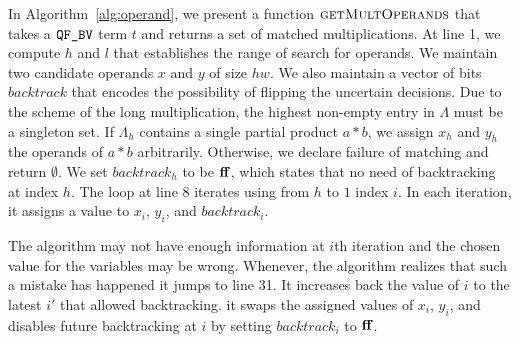 In Algorithm~\ref{alg:operand}, we present a function
$\textsc{getMultOperands}$ that takes a $\texttt{QF\_BV}$ term $t$ and returns a
set of matched multiplications.
%
At line 1, we compute $h$ and $l$ that establishes the range of search for
operands.
%
We maintain two candidate operands $x$ and $y$ of size $hw$.
%
We also maintain a vector of bits $backtrack$ that encodes 
the possibility of flipping the uncertain decisions.
%
Due to the scheme of the long multiplication, the highest
non-empty entry in $\Lambda$ must be a singleton set.
%
If $\Lambda_h$ contains a single partial product $a*b$,
we assign $x_h$ and $y_h$ the operands of $a*b$ arbitrarily.
%
Otherwise, we declare failure of matching and return $\emptyset$.
%
We set $backtrack_h$ to be $\mathbf{ff}$, which states that
no need of backtracking at index $h$.
%
The loop at line 8 iterates using from $h$ to $1$ index $i$.
%
In each iteration, it assigns a value to $x_i$, $y_i$, and $backtrack_i$. 
%

The algorithm may not have enough information at $i$th iteration and
the chosen value for the variables may be wrong.
%
Whenever, the algorithm realizes that such a mistake has happened
it jumps to line 31.
%
It increases back the value of $i$
to the latest $i'$ that allowed backtracking.
%
it swaps the assigned values of $x_i$, $y_i$, and disables future
backtracking at $i$ by setting $backtrack_i$ to
$\mathbf{ff}$.
%

